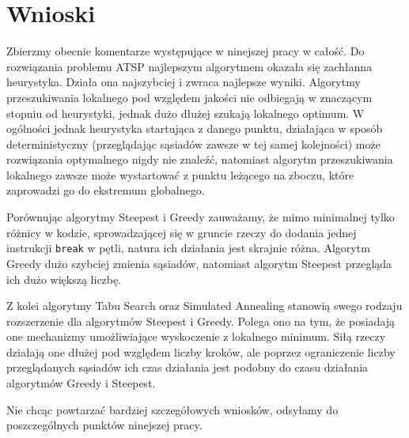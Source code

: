 \section{Wnioski}
Zbierzmy obecnie komentarze występujące w ninejszej pracy w całość. Do rozwiązania problemu ATSP najlepszym algorytmem okazała się zachłanna heurystyka. Działa ona najszybciej i zwraca najlepsze wyniki. Algorytmy przeszukiwania lokalnego pod względem jakości nie odbiegają w znaczącym stopniu od heurystyki, jednak dużo dłużej szukają lokalnego optimum. W ogólności jednak heurystyka startująca z danego punktu, działająca w sposób deterministyczny (przeglądając sąsiadów zawsze w tej samej kolejności) może rozwiązania optymalnego nigdy nie znaleźć, natomiast algorytm przeszukiwania lokalnego zawsze może wystartować z punktu leżącego na zboczu, które zaprowadzi go do ekstremum globalnego.

Porównując algorytmy Steepest i Greedy zauważamy, że mimo minimalnej tylko różnicy w kodzie, sprowadzającej się w gruncie rzeczy do dodania jednej instrukcji \texttt{break} w pętli, natura ich działania jest skrajnie różna. Algorytm Greedy dużo szybciej zmienia sąsiadów, natomiast algorytm Steepest przegląda ich dużo większą liczbę.

Z kolei algorytmy Tabu Search oraz Simulated Annealing stanowią swego rodzaju rozszerzenie dla algorytmów Steepest i Greedy. Polega ono na tym, że posiadają one mechanizmy umożliwiające wyskoczenie z lokalnego minimum. Siłą rzeczy działają one dłużej pod względem liczby kroków, ale poprzez ograniczenie liczby przeglądanych sąsiadów ich czas działania jest podobny do czasu działania algorytmów Greedy i Steepest.

Nie chcąc powtarzać bardziej szczegółowych wniosków, odsyłamy do poszczególnych punktów ninejszej pracy.
